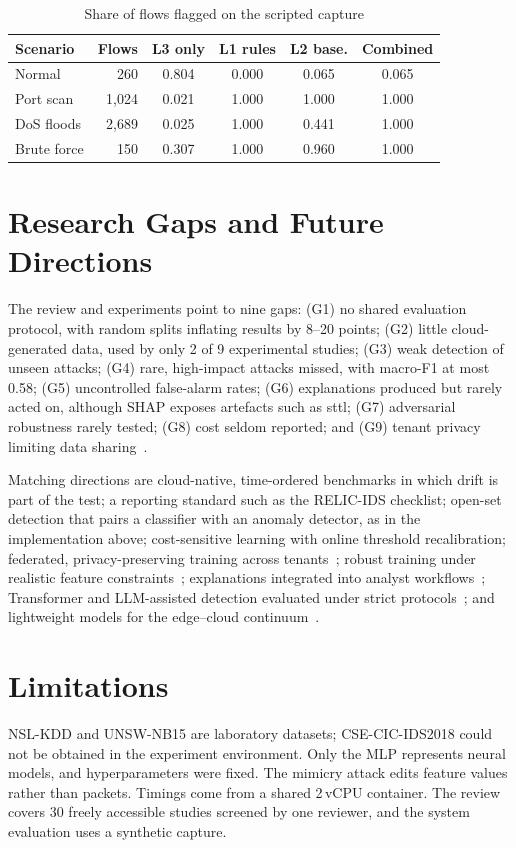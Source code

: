 \documentclass[conference]{IEEEtran}
\begin{document}
\begin{table}[t]
\caption{Share of flows flagged on the scripted capture}
\label{tab:demo}
\centering\footnotesize
\begin{tabular}{@{}lrcccc@{}}
\toprule
Scenario & Flows & L3 only & L1 rules & L2 base. & Combined\\
\midrule
Normal & 260 & 0.804 & 0.000 & 0.065 & 0.065\\
Port scan & 1,024 & 0.021 & 1.000 & 1.000 & 1.000\\
DoS floods & 2,689 & 0.025 & 1.000 & 0.441 & 1.000\\
Brute force & 150 & 0.307 & 1.000 & 0.960 & 1.000\\
\bottomrule
\end{tabular}
\end{table}

\section{Research Gaps and Future Directions}
The review and experiments point to nine gaps: (G1) no shared evaluation protocol, with random splits inflating results by 8--20 points; (G2) little cloud-generated data, used by only 2 of 9 experimental studies; (G3) weak detection of unseen attacks; (G4) rare, high-impact attacks missed, with macro-F1 at most 0.58; (G5) uncontrolled false-alarm rates; (G6) explanations produced but rarely acted on, although SHAP exposes artefacts such as sttl; (G7) adversarial robustness rarely tested; (G8) cost seldom reported; and (G9) tenant privacy limiting data sharing~\cite{agrawal2022}.

Matching directions are cloud-native, time-ordered benchmarks in which drift is part of the test; a reporting standard such as the RELIC-IDS checklist; open-set detection that pairs a classifier with an anomaly detector, as in the implementation above; cost-sensitive learning with online threshold recalibration; federated, privacy-preserving training across tenants~\cite{agrawal2022}; robust training under realistic feature constraints~\cite{alhajjar2021}; explanations integrated into analyst workflows~\cite{lundberg2017,khan2024,kumar2024}; Transformer and LLM-assisted detection evaluated under strict protocols~\cite{long2024,kheddar2024}; and lightweight models for the edge--cloud continuum~\cite{rizvi2023}.

\section{Limitations}
NSL-KDD and UNSW-NB15 are laboratory datasets; CSE-CIC-IDS2018 could not be obtained in the experiment environment. Only the MLP represents neural models, and hyperparameters were fixed. The mimicry attack edits feature values rather than packets. Timings come from a shared 2\,vCPU container. The review covers 30 freely accessible studies screened by one reviewer, and the system evaluation uses a synthetic capture.
\end{document}
